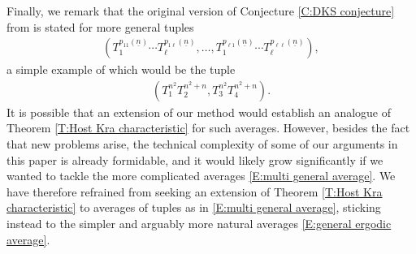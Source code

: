 \documentclass[11pt]{amsart}
\theoremstyle{definition}
\newcommand{\un}{{\underline{n}}}
\begin{document}


 Finally, we remark that the original version of Conjecture \ref{C:DKS conjecture} from \cite{DKS19} is stated for more general tuples
\begin{align}\label{E:multi general average}
	(T_1^{p_{11}(\un)}\cdots T_\ell^{p_{1\ell}(\un)}, \ldots, T_1^{p_{\ell 1}(\un)}\cdots T_\ell^{p_{\ell\ell}(\un)}),
\end{align}
a simple example of which would be the tuple
\begin{align*}
	(T_1^{n^2}T_2^{n^2+n}, T_3^{n^2}T_4^{n^2+n}).
\end{align*}
It is possible that an extension of our method would establish an analogue of Theorem \ref{T:Host Kra characteristic} for such averages. However, besides the fact that new problems arise, the technical complexity of some of our arguments in this paper is already formidable, and it would likely grow significantly if we wanted to tackle the more complicated averages \eqref{E:multi general average}. We have therefore refrained from seeking an extension of Theorem \ref{T:Host Kra characteristic} to averages of tuples as in  \eqref{E:multi general average}, sticking instead to the simpler and  arguably more natural averages \eqref{E:general ergodic average}.
\end{document}
